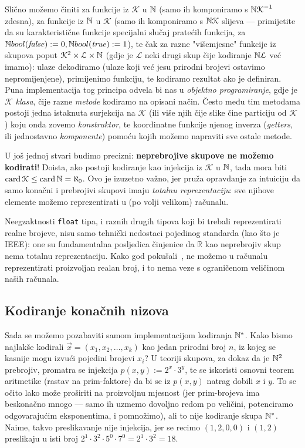 Slično možemo činiti za funkcije iz $\mathcal K$ u ${\mathbb N}$ (samo ih komponiramo s ${{\mathbb N}\mathcal K}^{-1}$ zdesna), za funkcije iz ${\mathbb N}$ u $\mathcal K$ (samo ih komponiramo s ${{\mathbb N}\mathcal K}$ slijeva --- primijetite da su karakteristične funkcije specijalni slučaj pratećih funkcija, za ${\mathbb N} bool(\mathit{false}):=0,{\mathbb N} bool(\mathit{true}):=1$), te čak za razne "višemjesne" funkcije iz skupova poput $\mathcal K^2\times \mathcal L\times{\mathbb N}$ (gdje je $\mathcal L$ neki drugi skup čije kodiranje ${\mathbb N}\mathcal L$ već imamo): ulaze dekodiramo (ulaze koji već jesu prirodni brojevi ostavimo nepromijenjene), primijenimo funkciju, te kodiramo rezultat ako je definiran. Puna implementacija tog principa odvela bi nas u \emph{objektno programiranje}, gdje je $\mathcal K$ \emph{klasa}, čije razne \emph{metode} kodiramo na opisani način. Često među tim metodama postoji jedna istaknuta surjekcija na $\mathcal K$ (ili više njih čije slike čine particiju od $\mathcal K$) koju onda zovemo \emph{konstruktor}, te koordinatne funkcije njenog inverza (\emph{getters}, ili jednostavno \emph{komponente}) pomoću kojih možemo napraviti sve ostale metode.

\begin{napomena}
U još jednoj stvari budimo precizni: \textbf{neprebrojive skupove ne možemo kodirati}! Doista, ako postoji kodiranje kao injekcija iz $\mathcal K$ u ${\mathbb N}$, tada mora biti $\operatorname{card}\mathcal K\le\operatorname{card}{\mathbb N}=\aleph_0$. Ovo je izuzetno važno, jer pruža opravdanje za intuiciju da samo konačni i prebrojivi skupovi imaju \emph{totalnu reprezentaciju}: sve njihove elemente možemo reprezentirati u (po volji velikom) računalu. 

Neegzaktnosti \texttt{float} tipa, i raznih drugih tipova koji bi trebali reprezentirati realne brojeve, nisu samo tehnički nedostaci pojedinog standarda (kao što je IEEE): one su fundamentalna posljedica činjenice da $\mathbb R$ kao neprebrojiv skup nema totalnu reprezentaciju. Kako god pokušali~\cite{url:calc}, ne možemo u računalu reprezentirati proizvoljan realan broj, i to nema veze s ograničenom veličinom naših 
računala.
\end{napomena}

\subsection{Kodiranje konačnih nizova}
Sada se možemo pozabaviti samom implementacijom kodiranja ${\mathbb N}^*$. Kako bismo najlakše kodirali $\vec x=(x_1,x_2,\dotsc,x_k)$ kao jedan prirodni broj $n$, iz kojeg se kasnije mogu izvući pojedini brojevi $x_i$? U teoriji skupova, za dokaz da je ${\mathbb N}^2$ prebrojiv, promatra se injekcija $p(x,y):=2^x\cdot3^y$, te se iskoristi osnovni teorem aritmetike (rastav na prim-faktore) da bi se iz $p(x,y)$ natrag dobili $x$ i $y$. To se očito lako može proširiti na proizvoljnu mjesnost (jer prim-brojeva ima beskonačno mnogo --- samo ih uzmemo dovoljno redom po veličini, potenciramo odgovarajućim eksponentima, i pomnožimo), ali to nije kodiranje skupa ${\mathbb N}^*$. Naime, takvo preslikavanje nije injekcija, jer se recimo $(1,2,0,0)$ i $(1,2)$ preslikaju u isti broj $2^1\cdot3^2\cdot5^0\cdot7^0=2^1\cdot3^2=18$.


